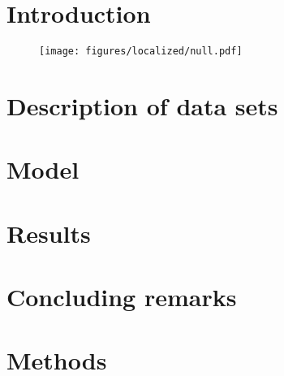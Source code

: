 

\section{Introduction}
\label{sec:papertag.introduction}


\begin{figure}[tp!]
  \centering	
    \texttt{[image: figures/localized/null.pdf]}  
  \caption{
  }
  \label{fig:papertag.}
\end{figure}

\section{Description of data sets}
\label{sec:papertag.data}


\section{Model}
\label{sec:papertag.model}

\section{Results}
\label{sec:papertag.results}


\section{Concluding remarks}
\label{sec:papertag.concludingremarks}


\section{Methods}
\label{sec:papertag.methods}

